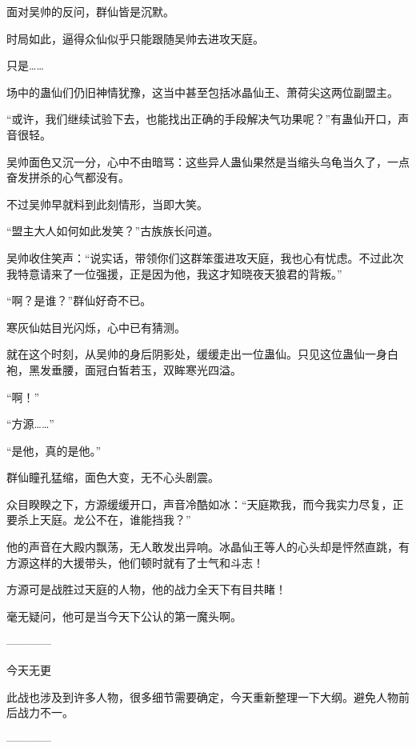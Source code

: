 \begin{this_body}
面对吴帅的反问，群仙皆是沉默。

时局如此，逼得众仙似乎只能跟随吴帅去进攻天庭。

只是……

场中的蛊仙们仍旧神情犹豫，这当中甚至包括冰晶仙王、萧荷尖这两位副盟主。

“或许，我们继续试验下去，也能找出正确的手段解决气功果呢？”有蛊仙开口，声音很轻。

吴帅面色又沉一分，心中不由暗骂：这些异人蛊仙果然是当缩头乌龟当久了，一点奋发拼杀的心气都没有。

不过吴帅早就料到此刻情形，当即大笑。

“盟主大人如何如此发笑？”古族族长问道。

吴帅收住笑声：“说实话，带领你们这群笨蛋进攻天庭，我也心有忧虑。不过此次我特意请来了一位强援，正是因为他，我这才知晓夜天狼君的背叛。”

“啊？是谁？”群仙好奇不已。

寒灰仙姑目光闪烁，心中已有猜测。

就在这个时刻，从吴帅的身后阴影处，缓缓走出一位蛊仙。只见这位蛊仙一身白袍，黑发垂腰，面冠白皙若玉，双眸寒光四溢。

“啊！”

“方源……”

“是他，真的是他。”

群仙瞳孔猛缩，面色大变，无不心头剧震。

众目睽睽之下，方源缓缓开口，声音冷酷如冰：“天庭欺我，而今我实力尽复，正要杀上天庭。龙公不在，谁能挡我？”

他的声音在大殿内飘荡，无人敢发出异响。冰晶仙王等人的心头却是怦然直跳，有方源这样的大援带头，他们顿时就有了士气和斗志！

方源可是战胜过天庭的人物，他的战力全天下有目共睹！

毫无疑问，他可是当今天下公认的第一魔头啊。

------------

今天无更

此战也涉及到许多人物，很多细节需要确定，今天重新整理一下大纲。避免人物前后战力不一。

------------

\end{this_body}

